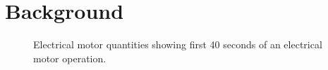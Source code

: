 \documentclass[letterpaper]{article}
\begin{document}
\section{Background}
\label{sec:back}
\begin{figure}[ht!]
    \centering
    \caption{Electrical motor quantities showing first 40 seconds of an electrical motor operation. }
    \label{fig:sim_raw_data}
\end{figure}
\end{document}
